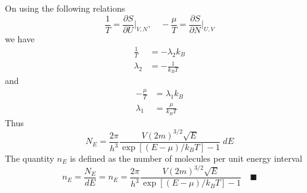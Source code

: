 \documentclass[../../../Main.tex]{subfiles}
\begin{document}
On using the following relations
\begin{equation*}
    \frac{1}{T}=\frac{\partial S}{\partial U}\bigg|_{V,N},\quad -\frac{\mu}{T}=\frac{\partial S}{\partial N}\bigg|_{U,V}
\end{equation*}
we have 
\begin{align*}
    \frac{1}{T}&=-\lambda_2k_B\\
    \lambda_2&=-\frac{1}{k_BT}
\end{align*}
and
\begin{align*}
    -\frac{\mu}{T}&=\lambda_1k_B\\
    \lambda_1&=\frac{\mu}{k_BT}
\end{align*}
Thus
\begin{equation*}
    N_E=\frac{2\pi}{h^3} \frac{V (2m)^{3/2}\sqrt{E}}{\exp\left[(E-\mu)/k_BT\right]-1} \;dE
\end{equation*}
The quantity $n_E$ is defined as the number of molecules per unit energy interval
\begin{equation*}
    n_E=\frac{N_E}{dE}=     n_E=\frac{2\pi}{h^3} \frac{V (2m)^{3/2}\sqrt{E}}{\exp\left[(E-\mu)/k_BT\right]-1} \quad\blacksquare
\end{equation*}
\end{document}
